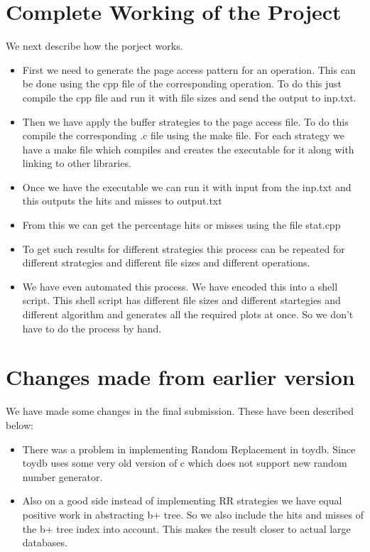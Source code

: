 \section*{{Complete Working of the Project}}
We next describe how the porject works. 
\begin{itemize}
\item First we need to generate the page access pattern for an operation. This can be done using the cpp file of the corresponding operation. To do this just compile the cpp file  and run it with file sizes and send the output to inp.txt.
\item Then we have apply the buffer strategies to the page access file. To do this compile the corresponding .c file using the make file. For each strategy we have a make file which compiles and creates the executable for it along with linking to other libraries.
\item Once we have the executable we can run it with input from the inp.txt and this outputs the hits and misses to output.txt
\item From this we can get the percentage hits or misses using the file stat.cpp
\item To get such results for different strategies this process can be repeated for different strategies and different file sizes and different operations. 
\item We have even automated this process. We have encoded this into a shell script. This shell script has different file sizes and different startegies and different algorithm and generates all the required plots at once. So we don't have to do the process by hand.
\end{itemize}

\section*{{Changes made from earlier version}}
We have made some changes in the final submission. These have been described below:
\begin{itemize}
\item There was a problem in implementing Random Replacement in toydb. Since toydb uses some very old version of c which does not support new random number generator. 
\item Also on a good side instead of implementing RR strategies we have equal positive work in abstracting b+ tree. So we also include the hits and misses of the b+ tree index into account. This makes the result closer to actual large databases. 
\end{itemize}

